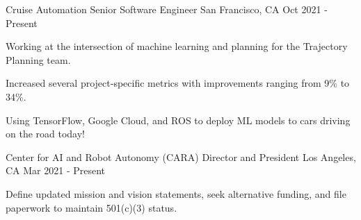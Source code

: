 


\begin{cventries}

\cventry
{Cruise Automation}
{Senior Software Engineer}
{San Francisco, CA}
{Oct 2021 - Present}
{
\begin{cvitems}
\item Working at the intersection of machine learning and planning for the Trajectory Planning team.
\item Increased several project-specific metrics with improvements ranging from 9\% to 34\%.
\item Using TensorFlow, Google Cloud, and ROS to deploy ML models to cars driving on the road today!
\end{cvitems}
}

\cventry
{Center for AI and Robot Autonomy (CARA)}
{Director and President}
{Los Angeles, CA}
{Mar 2021 - Present}
{
\begin{cvitems}
\item Define updated mission and vision statements, seek alternative funding, and file paperwork to maintain 501(c)(3) status.
\end{cvitems}
}


\end{cventries}

